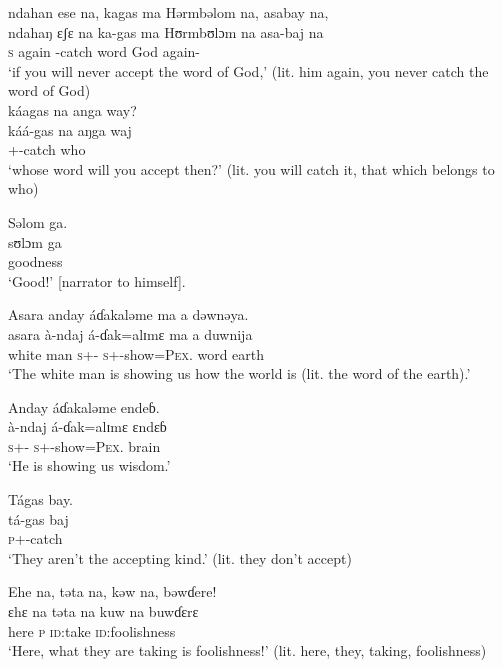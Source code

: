  \medskip
  ndahan  ese  na,  kagas  ma  Hərmbəlom  na,  asabay  na,  \\
 \gll ndahaŋ  ɛʃɛ  na  ka-gas      ma  Hʊrmbʊlɔm  na       asa-baj         na\\
 \textsc{s}     again    {\PSP}    {\twoS}-catch    word     God          {\PSP}  again-{\NEG}  {\PSP} \\
 \glt ‘if you will never accept the word of God,’ (lit. him again, you never catch the word of God)\\
 
 \medskip
  káagas  na  anga  way?\\
 \gll káá-gas            na      aŋga     waj\\
 {\twoS}+{\POT}-catch    {\PSP}   {\POSS}  who\\
 \glt ‘whose word will you accept then?’ (lit. you will catch it, that which belongs to who)
 \z
 
\clearpage
 \ea Səlom  ga.  \\
 \gll sʊlɔm  ga \\
 goodness  {\ADJ}\\
 \glt ‘Good!’ [narrator to himself].
 \z

\ea Asara  anday  áɗakaləme  ma  a  dəwnəya.\\
 \gll asara   à-ndaj        á-ɗak=alɪmɛ               ma     a   duwnija\\
 {white man}     \textsc{s}+{\PFV}-{\PROG}  \textsc{s}+{\IFV}-show=\textsc{Pex}.{\IO}    word   {\GEN}    earth    \\
 \glt ‘The white man is showing us how the world is (lit. the word of the earth).’ 
 \z

\ea Anday  áɗakaləme  endeɓ.  \\
 \gll à-ndaj           á-ɗak=alɪmɛ     ɛndɛɓ \\
 \textsc{s}+{\PFV}-{\PROG}    \textsc{s}+{\IFV}-show=\textsc{Pex}.{\IO}  brain  \\
 \glt ‘He is showing us wisdom.’ 
 \z

\ea  Tágas  bay.\\
 \gll tá-gas     baj\\ 
 \textsc{p}+{\IFV}-catch  {\NEG}\\
 \glt ‘They aren’t the accepting kind.’ (lit. they don’t accept) 
 \z

\ea Ehe  na,  təta  na,  kəw  na,  bəwɗere!\\
 \gll ɛhɛ    na      təta   na       kuw      na  buwɗɛrɛ\\
 here   {\PSP}    \textsc{p}    {\PSP}    \textsc{id}:take   {\PSP}  \textsc{id}:foolishness\\
 \glt ‘Here, what they are taking is foolishness!’ (lit. here, they, taking, foolishness)
 \z

